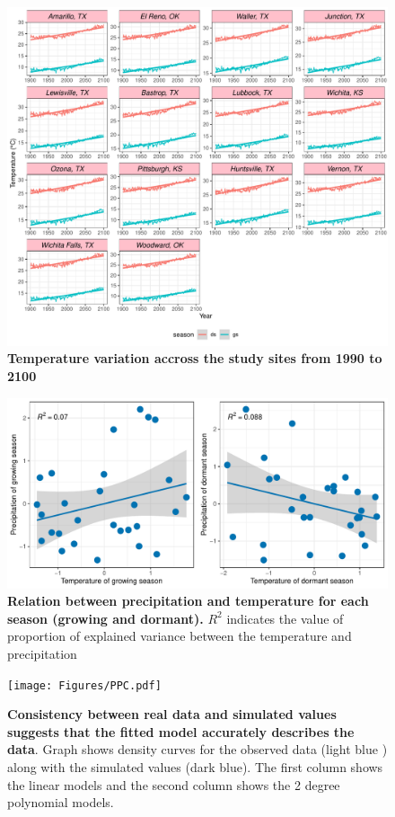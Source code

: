 \documentclass[12pt]{article}
\begin{document}
\begin{figure}[H]
		\centering
		\includegraphics[width=0.95\linewidth]{Figures/fig_tas_past_present_future.pdf}
		\caption{\textbf{Temperature variation accross the study sites from 1990 to 2100}}
		\label{Sup:temp_variation}
\end{figure}




\begin{figure}[H]
		\centering
		\includegraphics[width=0.95\linewidth]{Figures/Varianceexplained.pdf}
		\caption{\textbf{Relation between precipitation and temperature for each season (growing and dormant).} $R^2$ indicates the value of proportion of explained variance between the temperature and precipitation}
		\label{Sup:Correlation}
\end{figure}
	
\begin{figure}[H]
		\centering
		\texttt{[image: Figures/PPC.pdf]}
		\caption{\textbf{Consistency between real data and simulated values suggests that the fitted model accurately describes the data}. Graph shows density curves for the observed data (light blue ) along with the simulated values (dark blue). The first column shows the linear models and the second column shows the 2 degree polynomial models.}
		\label{Sup:PPC}
	\end{figure}
	
\end{document}
